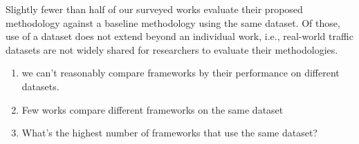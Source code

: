 \documentclass[manuscript,nonacm]{acmart}
\begin{document}
Slightly fewer than half of our surveyed works evaluate their proposed methodology against a baseline methodology using the same dataset.
Of those, use of a dataset does not extend beyond an individual work, i.e., real-world traffic datasets are not widely shared for researchers to evaluate their methodologies.


\begin{enumerate}
	\item we can't reasonably compare frameworks by their performance on different datasets.
	\item Few works compare different frameworks on the same dataset
	\item What's the highest number of frameworks that use the same dataset?
\end{enumerate}
\end{document}

